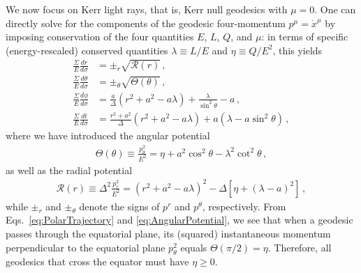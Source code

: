 \documentclass[graybox,envcountchap]{svmult}
\newcommand{\br}[1]{\left[#1\right]}
\newcommand{\pa}[1]{\left(#1\right)}
\begin{document}
We now focus on Kerr light rays, that is, Kerr null geodesics with $\mu=0$.
One can directly solve for the components of the geodesic four-momentum $p^\mu=\dot{x}^\mu$ by imposing conservation of the four quantities $E$, $L$, $Q$, and $\mu$: in terms of specific (energy-rescaled) conserved quantities $\lambda\equiv L/E$ and $\eta\equiv Q/E^2$, this yields \cite{Carter1968,GrallaLupsasca2020b}
\begin{align}
    \label{eq:RadialTrajectory}
    \frac{\Sigma}{E}\frac{dr}{d\sigma}&=\pm_r\sqrt{\mathcal{R}(r)}\,,\\
    \label{eq:PolarTrajectory}
    \frac{\Sigma}{E}\frac{d\theta}{d\sigma}&=\pm_\theta\sqrt{\Theta(\theta)}\,,\\
    \label{eq:AzimuthalTrajectory}
    \frac{\Sigma}{E}\frac{d\phi}{d\sigma}&=\frac{a}{\Delta}\pa{r^2+a^2-a\lambda}+\frac{\lambda}{\sin^2{\theta}}-a\,,\\
    \label{eq:TemporalTrajectory}
    \frac{\Sigma}{E}\frac{dt}{d\sigma}&=\frac{r^2+a^2}{\Delta}\pa{r^2+a^2-a\lambda}+a\pa{\lambda-a\sin^2{\theta}}\,,
\end{align}
where we have introduced the angular potential
\begin{align}
    \label{eq:AngularPotential}
    \Theta(\theta)\equiv\frac{p_\theta^2}{E^2}
    =\eta+a^2\cos^2{\theta}-\lambda^2\cot^2{\theta}\,,
\end{align}
as well as the radial potential 
\begin{align}
    \label{eq:RadialPotential}
    \mathcal{R}(r)\equiv\Delta^2\frac{p_r^2}{E^2}
    =\pa{r^2+a^2-a\lambda}^2-\Delta\br{\eta+\pa{\lambda-a}^2}\,,
\end{align}
while $\pm_r$ and $\pm_\theta$ denote the signs of $p^r$ and $p^\theta$, respectively.
From Eqs.~\eqref{eq:PolarTrajectory} and \eqref{eq:AngularPotential}, we see that when a geodesic passes through the equatorial plane, its (squared) instantaneous momentum perpendicular to the equatorial plane $p_\theta^2$ equals $\Theta(\pi/2)=\eta$.
Therefore, all geodesics that cross the equator must have $\eta\geq0$.
\end{document}
